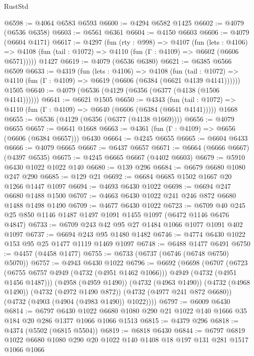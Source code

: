 \begin{lexlean}{RustStd}
\begin{coremodule}
{\begin{coremodule}
{{{{{{{{{{{{{{@6598 := @4064 @6583 @6593
@6600 := @4294 @6582 @1425
@6602 := @4079 (@6536 @6358)
@6603 := @6561 @6361
@6604 := @4150 @6603
@6606 := @4079 (@6604 @4171)
@6617 := @4297
    (fun (rty : @998) =>
    @4107
      (fun (lets : @4106) =>
      @4108 (fun (tail : @1072) => @4110 (fun (Γ : @4109) => @6602 (@6606 @6571)))))
    @1427
@6619 := @4079 (@6536 @6380)
@6621 := @6385 @6566 @6509
@6633 := @4319
    (fun (lets : @4106) =>
    @4108
      (fun (tail : @1072) => @4110 (fun (Γ : @4109) => @6619 (@6606 (@6384 (@6621 @4139 @4141))))))
    @1505
@6640 := @4079 (@6536 (@4129 (@6356 (@6377 (@4138 (@1506 @4141))))))
@6641 := @6621 @1505
@6650 := @4343
    (fun (tail : @1072) => @4110 (fun (Γ : @4109) => @6640 (@6606 (@6384 (@6641 @4141)))))
    @1668
@6655 := @6536 (@4129 (@6356 (@6377 (@4138 @1669))))
@6656 := @4079 @6655
@6657 := @6641 @1668
@6663 := @4361 (fun (Γ : @4109) => @6656 (@6606 (@6384 @6657))) @6430
@6664 := @4245 @6655
@6665 := @6604 @6433
@6666 := @4079 @6665
@6667 := @6437 @6657
@6671 := @6664 (@6666 @6667) (@4397 @6535)
@6675 := @4245 @6665 @6667 (@4402 @6603)
@6679 := @5910 @6430 @1022 @1022 @140
@6680 := @139 @296
@6684 := @6679 @6680 @1080 @247 @290
@6685 := @129 @21
@6692 := @6684 @6685 @1502 @1667 @20 @1266 @1447 @1097
@6694 := @4693 @6430 @1022
@6698 := @6694 @247 @6680 @1488 @1500
@6707 := @4663 @6430 @1022 @241 @246 @872 @6680 @1488 @1498 @1490
@6709 := @4677 @6430 @1022
@6723 := @6709 @40 @245 @25 @850 @1146 @1487 @1497 @1091 @1455 @1097 (@6472 @1146 @6476 @4847)
@6733 := @6709 @243 @42 @95 @27 @1484 @1066 @1077 @1091 @402 @1097
@6737 := @6694 @243 @95 @1480 @1482
@6746 := @4774 @6430 @1022 @153 @95 @25 @1477 @1119 @1469 @1097
@6748 := @6488 @1477 @6491
@6750 := @4457 (@4458 @1477)
@6755 := @6733 (@6737 (@6746 (@6748 @6750) @5070))
@6757 := @4943 @6430 @1022
@6796 := @6692
    (@6698
      (@6707
        (@6723 (@6755 @6757 @4949 (@4732 (@4951 @1462 @1066))) @4949 (@4732 (@4951 @1456 @1487)))
        (@4958 (@4959 @1490))
        (@4732 (@4963 @1490))
        (@4732 (@4968 @1490))
        (@4732 (@4972 @1490 @872))
        (@4732 (@4977 @241 @872 @6680))
        (@4732 (@4903 (@4904 (@4983 @1490)) @1022))))
@6797 := @6009 @6430
@6814 := @6797
    @6430
    @1022
    @6680
    @1080
    @290
    @21
    @1022
    @140
    @1666
    @35
    @184
    @20
    @286
    @1377
    @1066
    @1066
    @1513
@6815 := @4379 @296
@6818 := @4374 (@5502 (@6815 @5504))
@6819 := @6818 @6430
@6844 := @6797
    @6819
    @1022
    @6680
    @1080
    @290
    @20
    @1022
    @140
    @1408
    @18
    @197
    @131
    @281
    @1517
    @1066
    @1066
}}}}}}}}}}}}}}
\end{coremodule}}
\end{coremodule}
\end{lexlean}
